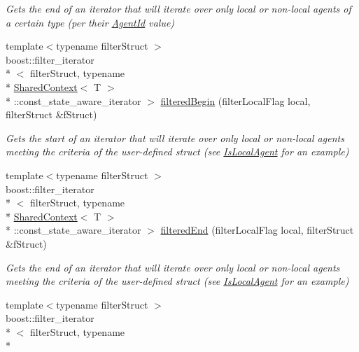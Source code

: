 \begin{DoxyCompactItemize}
\begin{DoxyCompactList}\small\item\em Gets the end of an iterator that will iterate over only local or non-\/local agents of a certain type (per their \hyperlink{classrepast_1_1_agent_id}{Agent\-Id} value) \end{DoxyCompactList}\item 
{\footnotesize template$<$typename filter\-Struct $>$ }\\boost\-::filter\-\_\-iterator\\*
$<$ filter\-Struct, typename \\*
\hyperlink{classrepast_1_1_shared_context}{Shared\-Context}$<$ T $>$\\*
\-::const\-\_\-state\-\_\-aware\-\_\-iterator $>$ \hyperlink{classrepast_1_1_shared_context_ab6e397073084a148cc768a904d7e5522}{filtered\-Begin} (filter\-Local\-Flag local, filter\-Struct \&f\-Struct)
\begin{DoxyCompactList}\small\item\em Gets the start of an iterator that will iterate over only local or non-\/local agents meeting the criteria of the user-\/defined struct (see \hyperlink{structrepast_1_1_is_local_agent}{Is\-Local\-Agent} for an example) \end{DoxyCompactList}\item 
{\footnotesize template$<$typename filter\-Struct $>$ }\\boost\-::filter\-\_\-iterator\\*
$<$ filter\-Struct, typename \\*
\hyperlink{classrepast_1_1_shared_context}{Shared\-Context}$<$ T $>$\\*
\-::const\-\_\-state\-\_\-aware\-\_\-iterator $>$ \hyperlink{classrepast_1_1_shared_context_a86555cc3bdc22642f497e48e5c0bba4b}{filtered\-End} (filter\-Local\-Flag local, filter\-Struct \&f\-Struct)
\begin{DoxyCompactList}\small\item\em Gets the end of an iterator that will iterate over only local or non-\/local agents meeting the criteria of the user-\/defined struct (see \hyperlink{structrepast_1_1_is_local_agent}{Is\-Local\-Agent} for an example) \end{DoxyCompactList}\item 
{\footnotesize template$<$typename filter\-Struct $>$ }\\boost\-::filter\-\_\-iterator\\*
$<$ filter\-Struct, typename \\*

\end{DoxyCompactItemize}
